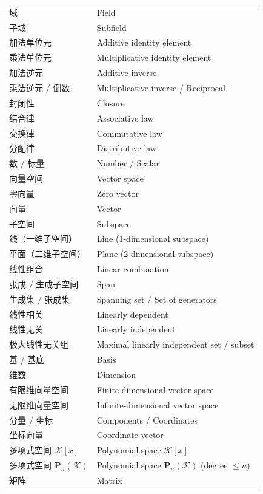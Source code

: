 \documentclass{ctexart}
\begin{document}
\begin{center}
\begin{longtable}{|>{\raggedright\arraybackslash}p{5cm}|>{\raggedright\arraybackslash}p{8cm}|}
			域 & Field \\
			子域 & Subfield \\
			加法单位元 & Additive identity element \\
			乘法单位元 & Multiplicative identity element \\
			加法逆元 & Additive inverse \\
			乘法逆元 / 倒数 & Multiplicative inverse / Reciprocal \\
			封闭性 & Closure \\
			结合律 & Associative law \\
			交换律 & Commutative law \\
			分配律 & Distributive law \\
			数 / 标量 & Number / Scalar \\
			向量空间 & Vector space \\
			零向量 & Zero vector \\
			向量 & Vector \\
			子空间 & Subspace \\
			线（一维子空间） & Line (1-dimensional subspace) \\
			平面（二维子空间） & Plane (2-dimensional subspace) \\
			线性组合 & Linear combination \\
			张成 / 生成子空间 & Span \\
			生成集 / 张成集 & Spanning set / Set of generators \\
			线性相关 & Linearly dependent \\
			线性无关 & Linearly independent \\
			极大线性无关组 & Maximal linearly independent set / subset \\
			基 / 基底 & Basis \\
			维数 & Dimension \\
			有限维向量空间 & Finite-dimensional vector space \\
			无限维向量空间 & Infinite-dimensional vector space \\
			分量 / 坐标 & Components / Coordinates \\
			坐标向量 & Coordinate vector \\
			多项式空间 $\mathcal{K}[x]$ & Polynomial space $\mathcal{K}[x]$ \\
			多项式空间 $\mathbf P_n(\mathcal{K})$ & Polynomial space $\mathbf P_n(\mathcal{K})$ (degree $\le n$) \\
			矩阵 & Matrix \\

\end{longtable}
\end{center}
\end{document}
